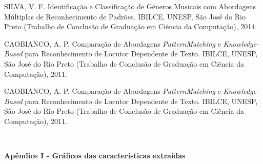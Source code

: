 \documentclass[a4paper,12pt,twoside,openright]{report}
\begin{document}
\begin{thebibliography}{00}
\begin{singlespace}
	SILVA, V. F. Identifica{\c c}\~{a}o e Classifica{\c c}\~{a}o de G\~{e}neros Musicais com Abordagens M\'{u}ltiplas de Reconhecimento de Padr\~{o}es. IBILCE, UNESP, S\~{a}o Jos\'{e} do Rio Preto (Trabalho de Conclus\~{a}o de Gradua{\c c}\~{a}o em Ci\~{e}ncia da Computa{\c c}\~{a}o), 2014.
\end{singlespace}


\begin{singlespace}
	CAOBIANCO, A. P. Compara{\c c}\~{a}o de Abordagens \textit{PatternMatching} e \textit{Knowledge-Based} para Reconhecimento de Locutor Dependente de Texto. IBILCE, UNESP, S\~{a}o Jos\'{e} do Rio Preto (Trabalho de Conclus\~{a}o de Gradua{\c c}\~{a}o em Ci\~{e}ncia da Computa{\c c}\~{a}o), 2011.
\end{singlespace}

\begin{singlespace}
	CAOBIANCO, A. P. Compara{\c c}\~{a}o de Abordagens \textit{PatternMatching} e \textit{Knowledge-Based} para Reconhecimento de Locutor Dependente de Texto. IBILCE, UNESP, S\~{a}o Jos\'{e} do Rio Preto (Trabalho de Conclus\~{a}o de Gradua{\c c}\~{a}o em Ci\~{e}ncia da Computa{\c c}\~{a}o), 2011.
\end{singlespace}

\end{thebibliography}
\thispagestyle{myheadings}
\newpage\ \thispagestyle{myheadings} \newpage
\thispagestyle{myheadings}

\appendix

\renewcommand{\chaptername}{Ap\^{e}ndice I - Gr\'{a}ficos das caracter\'{i}sticas extra\'{i}das}


\noindent

{\huge \vspace*{+79pt} \textbf{Ap\^{e}ndice I - Gr\'{a}ficos das caracter\'{i}sticas}}
{\huge \hspace*{+11pt} \textbf{extra\'{i}das}}
\end{document}
